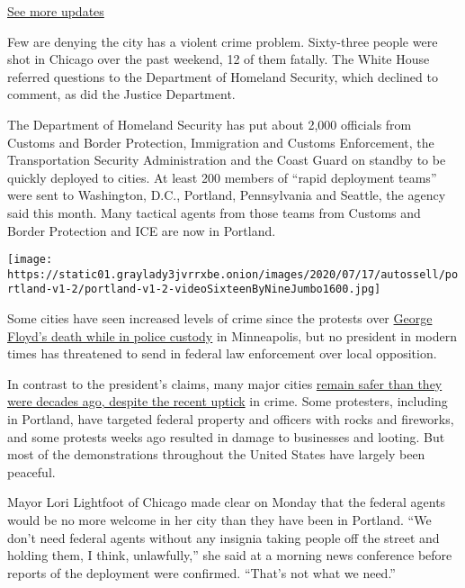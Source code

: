 \href{https://www.nytimes3xbfgragh.onion/2020/08/03/us/elections/biden-vs-trump.html?action=click\&pgtype=Article\&state=default\&region=MAIN_CONTENT_1\&context=storylines_live_updates}{See
more updates}

Few are denying the city has a violent crime problem. Sixty-three people
were shot in Chicago over the past weekend, 12 of them fatally. The
White House referred questions to the Department of Homeland Security,
which declined to comment, as did the Justice Department.

The Department of Homeland Security has put about 2,000 officials from
Customs and Border Protection, Immigration and Customs Enforcement, the
Transportation Security Administration and the Coast Guard on standby to
be quickly deployed to cities. At least 200 members of ``rapid
deployment teams'' were sent to Washington, D.C., Portland, Pennsylvania
and Seattle, the agency said this month. Many tactical agents from those
teams from Customs and Border Protection and ICE are now in Portland.

\texttt{[image: https://static01.graylady3jvrrxbe.onion/images/2020/07/17/autossell/portland-v1-2/portland-v1-2-videoSixteenByNineJumbo1600.jpg]}

Some cities have seen increased levels of crime since the protests over
\href{https://www.nytimes3xbfgragh.onion/2020/05/31/us/george-floyd-investigation.html}{George
Floyd's death while in police custody} in Minneapolis, but no president
in modern times has threatened to send in federal law enforcement over
local opposition.

In contrast to the president's claims, many major cities
\href{https://ucr.fbi.gov/crime-in-the-u.s/2018/crime-in-the-u.s.-2018/topic-pages/tables/table-1}{remain
safer than they were decades ago, despite the recent uptick} in crime.
Some protesters, including in Portland, have targeted federal property
and officers with rocks and fireworks, and some protests weeks ago
resulted in damage to businesses and looting. But most of the
demonstrations throughout the United States have largely been peaceful.

Mayor Lori Lightfoot of Chicago made clear on Monday that the federal
agents would be no more welcome in her city than they have been in
Portland. ``We don't need federal agents without any insignia taking
people off the street and holding them, I think, unlawfully,'' she said
at a morning news conference before reports of the deployment were
confirmed. ``That's not what we need.''


